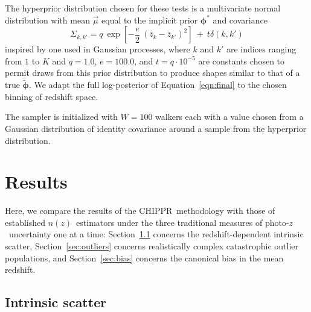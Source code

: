\documentclass[iop]{emulateapj}
\newcommand{\todo}[3]{{\color{#2}\emph{#1}: #3}}
\newcommand{\que}[1]{\todo{Question}{cyan}{#1}}
\newcommand{\Sect}[1]{Section~\ref{#1}}
\newcommand{\Eq}[1]{Equation~\ref{#1}}
\newcommand{\Fig}[1]{Figure~\ref{#1}}
\newcommand{\project}[1]{\textsc{#1}}
\newcommand{\Chippr}{\project{CHIPPR}}%
\newcommand{\pz}{photo-$z$}
\newcommand{\nz}{$n(z)$}
\newcommand{\bvec}[1]{\ensuremath{\boldsymbol{#1}}}%
\newcommand{\ndphi}{\bvec{\phi}}
\begin{document}
The hyperprior distribution chosen for these tests is a multivariate normal distribution with mean $\vec{\mu}$ equal to the implicit prior $\ndphi^{*}$ and covariance
\begin{equation}
\label{eqn:priorcov}
\Sigma_{k,k'} = q\ \exp[-\frac{e}{2}\ (\bar{z}_{k}-\bar{z}_{k'})^{2}]\ +\ t\delta(k,k')
\end{equation}
inspired by one used in Gaussian processes, where $k$ and $k'$ are indices ranging from $1$ to $K$ and $q=1.0$, $e=100.0$, and $t=q\cdot10^{-5}$ are constants chosen to permit draws from this prior distribution to produce shapes similar to that of a true $\tilde{\ndphi}$.  
We adapt the full log-posterior of \Eq{eqn:final} to the chosen binning of redshift space.


The sampler is initialized with $W=100$ walkers each with a value chosen from a Gaussian distribution of identity covariance around a sample from the hyperprior distribution.  

\section{Results}
\label{sec:alldata}

Here, we compare the results of the \Chippr\ methodology with those of established \nz\ estimators under the three traditional measures of \pz\ uncertainty one at a time:
\Sect{sec:scatter} concerns the redshift-dependent intrinsic scatter, \Sect{sec:outliers} concerns realistically complex catastrophic outlier populations, and \Sect{sec:bias} concerns the canonical bias in the mean redshift.

\subsection{Intrinsic scatter}
\label{sec:scatter}

\end{document}

